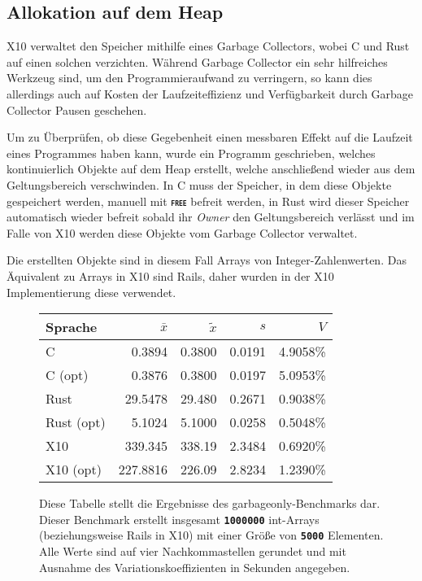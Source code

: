 \subsection{Allokation auf dem Heap}

X10 verwaltet den Speicher mithilfe eines Garbage Collectors, wobei C und Rust auf einen solchen verzichten.
Während Garbage Collector ein sehr hilfreiches Werkzeug sind, um den Programmieraufwand zu verringern, so kann dies
allerdings auch auf Kosten der Laufzeiteffizienz und Verfügbarkeit durch Garbage Collector Pausen geschehen.

Um zu Überprüfen, ob diese Gegebenheit einen messbaren Effekt auf die Laufzeit eines Programmes haben kann,
wurde ein Programm geschrieben, welches kontinuierlich Objekte auf dem Heap erstellt,
welche anschließend wieder aus dem Geltungsbereich verschwinden.
In C muss der Speicher, in dem diese Objekte gespeichert werden, manuell mit \texttt{\textsc{\textbf{free}}}
befreit werden, in Rust wird dieser Speicher automatisch wieder befreit sobald ihr \textit{Owner} den
Geltungsbereich verlässt und im Falle von X10 werden diese Objekte vom Garbage Collector verwaltet.

Die erstellten Objekte sind in diesem Fall Arrays von Integer-Zahlenwerten.
Das Äquivalent zu Arrays in X10 sind Rails, daher wurden in der X10 Implementierung diese verwendet.

\begin{figure}[hb]
	\begin{center}
		\begin{tabular}{lrrrr}
			\toprule
			Sprache    & $\bar{x}$ & $\tilde{x}$ & $s$ & $V$ \\
			\midrule
			C          & 0.3894   & 0.3800 & 0.0191 & 4.9058\%  \\
			C (opt)    & 0.3876   & 0.3800 & 0.0197 & 5.0953\%  \\
			Rust       & 29.5478  & 29.480 & 0.2671 & 0.9038\%  \\
			Rust (opt) & 5.1024   & 5.1000 & 0.0258 & 0.5048\%  \\
			X10        & 339.345  & 338.19 & 2.3484 & 0.6920\%  \\
			X10 (opt)  & 227.8816 & 226.09 & 2.8234 & 1.2390\%  \\
			\bottomrule
		\end{tabular}
	\end{center}
	\caption{
		Diese Tabelle stellt die Ergebnisse des garbageonly-Benchmarks dar. Dieser Benchmark erstellt insgesamt
		\texttt{\textsc{\textbf{1000000}}} int-Arrays (beziehungsweise Rails in X10) mit einer Größe von
		\texttt{\textsc{\textbf{5000}}} Elementen.
		Alle Werte sind auf vier Nachkommastellen gerundet und mit Ausnahme des Variationskoeffizienten
		in Sekunden angegeben.
	}
	\label{fig:garbageonly_table}
\end{figure}

